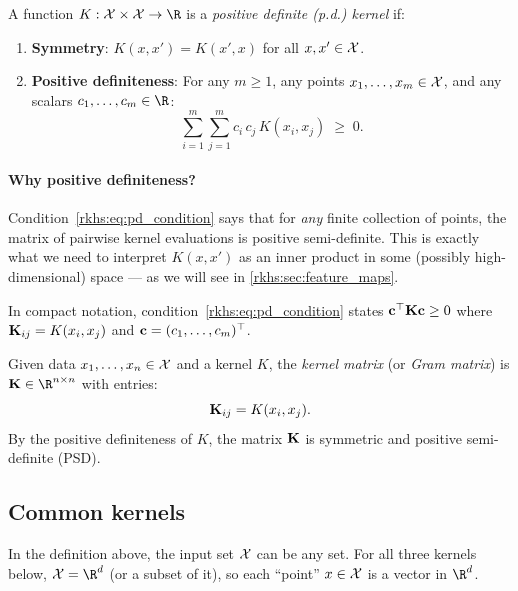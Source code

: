 \begin{notechapter}
\begin{definition}
\label{rkhs:def:pd_kernel}
A function $K: \X \times \X \to \R$ is a \emph{positive definite
(p.d.) kernel} if:
\begin{enumerate}[label=(\roman*)]
  \item \textbf{Symmetry}: $K(x, x') = K(x', x)$ for all $x, x' \in \mathcal{X}$.
  \item \textbf{Positive definiteness}: For any $m \geq 1$, any points
  $x_1, \ldots, x_m \in \mathcal{X}$, and any scalars $c_1, \ldots, c_m \in \R$:
  \begin{equation}
  \label{rkhs:eq:pd_condition}
  \sum_{i=1}^m \sum_{j=1}^m c_i\, c_j\, K(x_i, x_j) \;\geq\; 0.
  \end{equation}
\end{enumerate}
\end{definition}

\paragraph{Why positive definiteness?} Condition~\eqref{rkhs:eq:pd_condition}
says that for \emph{any} finite collection of points, the matrix of
pairwise kernel evaluations is positive semi-definite. This is exactly
what we need to interpret $K(x,x')$ as an inner product in some
(possibly high-dimensional) space --- as we will see in
\cref{rkhs:sec:feature_maps}.

In compact notation, condition~\eqref{rkhs:eq:pd_condition} states
$\mathbf{c}^\top \mathbf{K} \mathbf{c} \geq 0$ where $\mathbf{K}_{ij} = K(x_i, x_j)$
and $\mathbf{c} = (c_1, \ldots, c_m)^\top$.

\begin{definition}
\label{rkhs:def:gram_matrix}
Given data $x_1, \ldots, x_n \in \mathcal{X}$ and a kernel $K$, the
\emph{kernel matrix} (or \emph{Gram matrix}) is $\mat{K} \in \R^{n
\times n}$ with entries:
\[
\mathbf{K}_{ij} = K(x_i, x_j).
\]
By the positive definiteness of $K$, the matrix $\mathbf{K}$ is symmetric
and positive semi-definite (PSD).
\end{definition}

\subsection{Common kernels}
\label{rkhs:subsec:common_kernels}

In the definition above, the input set $\mathcal{X}$ can be any
set. For all three kernels below, $\X = \R^d$ (or a
subset of it), so each ``point'' $x \in \mathcal{X}$ is a
vector in $\R^d$.


\end{notechapter}
